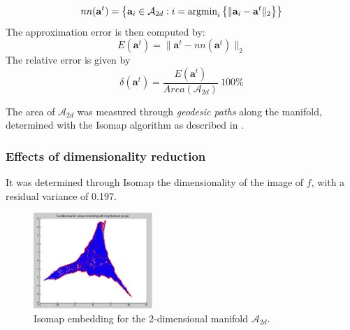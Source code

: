 \begin{equation}
nn(\mathbf{a}^{t} ) = \left\{ \mathbf{a}_{i} \in \mathcal{A}_{2d} : i = \mbox{argmin}_{i}\left\{ \| \mathbf{a}_{i} - \mathbf{a}^{t} \|_{2}\right\} \right\}
\end{equation}
The approximation error is then computed by:
\begin{equation}
E(\mathbf{a}^{t} ) = \| \mathbf{a}^{t} - nn(\mathbf{a}^{t}) \|_{2}
\end{equation}
The relative error is given by
\begin{equation}
\delta(\mathbf{a}^{t} ) = \frac{E(\mathbf{a}^{t} ) }{Area(\mathcal{A}_{2d} ) } \  100\% 
\end{equation}

The area of $\mathcal{A}_{2d}$ was measured through \emph{geodesic paths} along the manifold, determined with the Isomap algorithm as described in \cite{Tenenbaum00}. 

\subsubsection{Effects of dimensionality reduction}
It was determined through Isomap the dimensionality of the image of $f$, with a residual variance of 0.197.

\begin{figure}[!h]
 \centering
  \includegraphics[width=0.4\textwidth]{include/vowels/images/isomap2d}
  \caption{Isomap embedding for the 2-dimensional manifold $\mathcal{A}_{2d}$.}
  \label{fig:isomap2D}
\end{figure}

